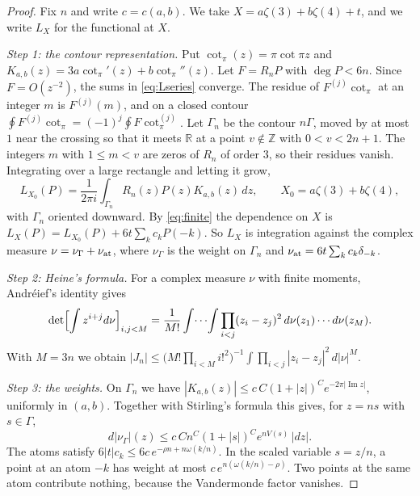\documentclass[11pt]{amsart}
\theoremstyle{definition}
\theoremstyle{remark}
\numberwithin{equation}{section}
\newcommand{\Z}{\mathbb Z}
\newcommand{\R}{\mathbb R}
\begin{document}
\begin{proof}
Fix $n$ and write $c=c(a,b)$. We take $X=a\zeta(3)+b\zeta(4)+t$, and we write $L_X$ for the functional at $X$.

\emph{Step 1: the contour representation.} Put $\cot_\pi(z)=\pi\cot\pi z$ and $K_{a,b}(z)=3a\cot_\pi'(z)+b\cot_\pi''(z)$. Let
$F=R_nP$ with $\deg P<6n$. Since $F=O(z^{-2})$, the sums in \eqref{eq:Lseries} converge. The residue of
$F^{(j)}\cot_\pi$ at an integer $m$ is $F^{(j)}(m)$, and on a closed contour
$\oint F^{(j)}\cot_\pi=(-1)^j\oint F\cot_\pi^{(j)}$. Let $\Gamma_n$ be the contour $n\Gamma$, moved by at most
$1$ near the crossing so that it meets $\R$ at a point $v\notin\Z$ with $0<v<2n+1$. The integers $m$ with $1\le m<v$
are zeros of $R_n$ of order $3$, so their residues vanish. Integrating over a large rectangle and letting it grow,
\[
 L_{X_0}(P)=\frac1{2\pi i}\int_{\Gamma_n}R_n(z)P(z)K_{a,b}(z)\,dz,\qquad X_0=a\zeta(3)+b\zeta(4),
\]
with $\Gamma_n$ oriented downward. By \eqref{eq:finite} the dependence on $X$ is $L_X(P)=L_{X_0}(P)+6t\sum_kc_kP(-k)$. So
$L_X$ is integration against the complex measure $\nu=\nu_\Gamma+\nu_{\rm at}$, where $\nu_\Gamma$ is the weight on
$\Gamma_n$ and $\nu_{\rm at}=6t\sum_kc_k\delta_{-k}$.

\emph{Step 2: Heine's formula.} For a complex measure $\nu$ with finite moments, Andr\'eief's identity
\cite{Forrester2018Andreief} gives
\[
 \det\Bigl[\int z^{i+j}d\nu\Bigr]_{i,j<M}=\frac1{M!}\int\!\cdots\!\int\prod_{i<j}(z_i-z_j)^2\,d\nu(z_1)\cdots d\nu(z_M).
\]
With $M=3n$ we obtain $|J_n|\le\bigl(M!\prod_{i<M}i!^2\bigr)^{-1}\int\prod_{i<j}|z_i-z_j|^2\,d|\nu|^{M}$.

\emph{Step 3: the weights.} On $\Gamma_n$ we have $|K_{a,b}(z)|\le c\,C(1+|z|)^Ce^{-2\pi|\operatorname{Im}z|}$, uniformly in
$(a,b)$. Together with Stirling's formula this gives, for $z=ns$ with $s\in\Gamma$,
\[
 d|\nu_\Gamma|(z)\le c\,Cn^C(1+|s|)^Ce^{nV(s)}\,|dz|.
\]
The atoms satisfy $6|t|c_k\le6c\,e^{-\rho n+n\omega(k/n)}$. In the scaled variable $s=z/n$, a point at an atom $-k$ has
weight at most $c\,e^{n(\omega(k/n)-\rho)}$. Two points at the same atom contribute nothing, because the Vandermonde
factor vanishes.


\end{proof}
\end{document}
